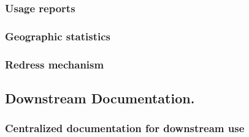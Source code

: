 \documentclass{article}
\begin{document}
\subsubsection{Usage reports}



\subsubsection{Geographic statistics}


\subsubsection{Redress mechanism}


\subsection{Downstream Documentation.}
\subsubsection{Centralized documentation for downstream use}

\end{document}
